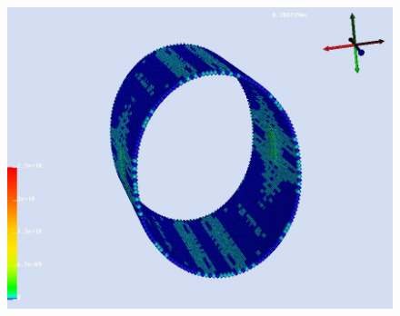\begin{figure}[htpb!]
\begin{center}
{                       \includegraphics{./Figs/shell_mpm/cs4.jpg}}

\end{center}
\end{figure}
